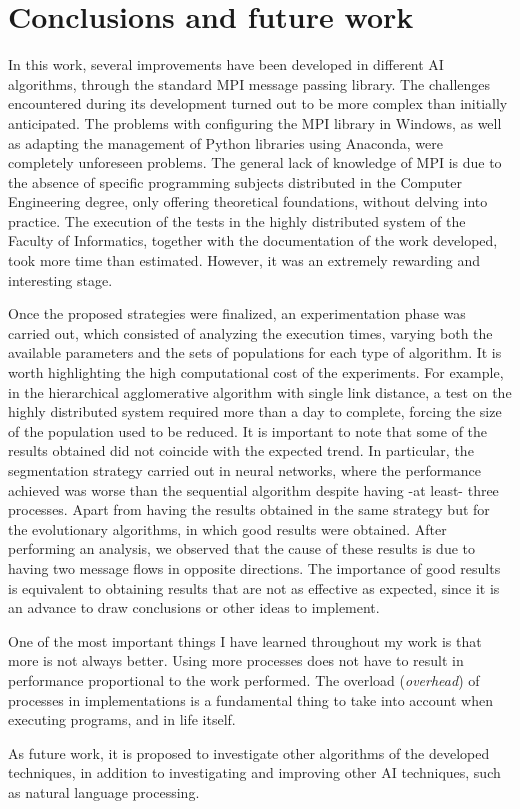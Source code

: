 \chapter*{Conclusions and future work}
\label{cap:c5_conclu}

	
	In this work, several improvements have been developed in different AI algorithms, through the standard MPI message passing library. The challenges encountered during its development turned out to be more complex than initially anticipated. The problems with configuring the MPI library in Windows, as well as adapting the management of Python libraries using Anaconda, were completely unforeseen problems. The general lack of knowledge of MPI is due to the absence of specific programming subjects distributed in the Computer Engineering degree, only offering theoretical foundations, without delving into practice. The execution of the tests in the highly distributed system of the Faculty of Informatics, together with the documentation of the work developed, took more time than estimated. However, it was an extremely rewarding and interesting stage.
	
	
	Once the proposed strategies were finalized, an experimentation phase was carried out, which consisted of analyzing the execution times, varying both the available parameters and the sets of populations for each type of algorithm. It is worth highlighting the high computational cost of the experiments. For example, in the hierarchical agglomerative algorithm with single link distance, a test on the highly distributed system required more than a day to complete, forcing the size of the population used to be reduced. It is important to note that some of the results obtained did not coincide with the expected trend. In particular, the segmentation strategy carried out in neural networks, where the performance achieved was worse than the sequential algorithm despite having -at least- three processes. Apart from having the results obtained in the same strategy but for the evolutionary algorithms, in which good results were obtained. After performing an analysis, we observed that the cause of these results is due to having two message flows in opposite directions. The importance of good results is equivalent to obtaining results that are not as effective as expected, since it is an advance to draw conclusions or other ideas to implement.
	
	
	One of the most important things I have learned throughout my work is that more is not always better. Using more processes does not have to result in performance proportional to the work performed. The overload (\textit{overhead}) of processes in implementations is a fundamental thing to take into account when executing programs, and in life itself.	
	
	
	As future work, it is proposed to investigate other algorithms of the developed techniques, in addition to investigating and improving other AI techniques, such as natural language processing.
	
	
	
	
	